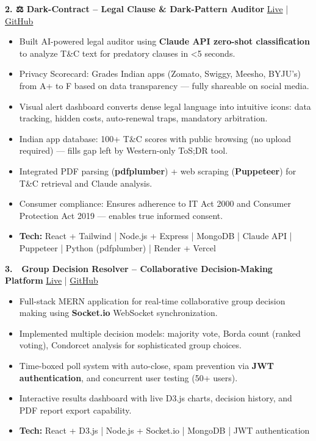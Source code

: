 \documentclass[9pt,a4paper]{article}
\begin{document}
\begin{tcolorbox}[enhanced,sharp corners,colback=white,boxrule=0pt,frame hidden,
borderline south={0.9pt}{0pt}{black!50}]
\textbf{2. ⚖️ Dark-Contract – Legal Clause \& Dark-Pattern Auditor} \hfill
\href{https://dark-contract.vercel.app}{Live} | 
\href{https://github.com/hanuman2005/dark-contract}{GitHub}
\begin{itemize}[topsep=1pt]
  \item Built AI-powered legal auditor using \textbf{Claude API zero-shot classification} to analyze T\&C text for predatory clauses in <5 seconds.
  \item Privacy Scorecard: Grades Indian apps (Zomato, Swiggy, Meesho, BYJU's) from A+ to F based on data transparency — fully shareable on social media.
  \item Visual alert dashboard converts dense legal language into intuitive icons: data tracking, hidden costs, auto-renewal traps, mandatory arbitration.
  \item Indian app database: 100+ T\&C scores with public browsing (no upload required) — fills gap left by Western-only ToS;DR tool.
  \item Integrated PDF parsing (\textbf{pdfplumber}) + web scraping (\textbf{Puppeteer}) for T\&C retrieval and Claude analysis.
  \item Consumer compliance: Ensures adherence to IT Act 2000 and Consumer Protection Act 2019 — enables true informed consent.
  \item \textbf{Tech:} React + Tailwind | Node.js + Express | MongoDB | Claude API | Puppeteer | Python (pdfplumber) | Render + Vercel
\end{itemize} \vspace{0.3ex}

\textbf{3. 🤝 Group Decision Resolver – Collaborative Decision-Making Platform} \hfill
\href{https://group-decision-resolver.vercel.app}{Live} | 
\href{https://github.com/hanuman2005/group-decision-resolver}{GitHub}
\begin{itemize}[topsep=1pt]
  \item Full-stack MERN application for real-time collaborative group decision making using \textbf{Socket.io} WebSocket synchronization.
  \item Implemented multiple decision models: majority vote, Borda count (ranked voting), Condorcet analysis for sophisticated group choices.
  \item Time-boxed poll system with auto-close, spam prevention via \textbf{JWT authentication}, and concurrent user testing (50+ users).
  \item Interactive results dashboard with live D3.js charts, decision history, and PDF report export capability.
  \item \textbf{Tech:} React + D3.js | Node.js + Socket.io | MongoDB | JWT authentication
\end{itemize} \vspace{0.3ex}


\end{tcolorbox}
\end{document}

